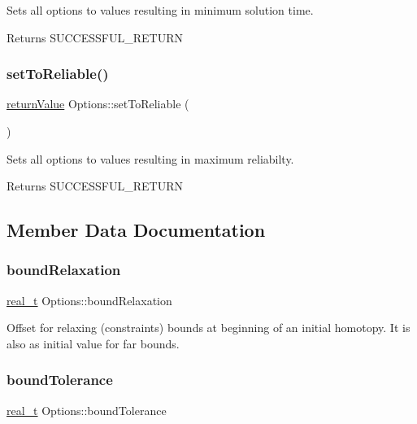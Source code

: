 Sets all options to values resulting in minimum solution time. \begin{DoxyReturn}{Returns}
S\+U\+C\+C\+E\+S\+S\+F\+U\+L\+\_\+\+R\+E\+T\+U\+RN 
\end{DoxyReturn}
\mbox{\label{class_options_a9febf0968f9e848e701b996b6694db73}} 
\subsubsection{\texorpdfstring{set\+To\+Reliable()}{setToReliable()}}
{\footnotesize\ttfamily \hyperlink{_message_handling_8hpp_a81d556f613bfbabd0b1f9488c0fa865e}{return\+Value} Options\+::set\+To\+Reliable (\begin{DoxyParamCaption}{ }\end{DoxyParamCaption})}

Sets all options to values resulting in maximum reliabilty. \begin{DoxyReturn}{Returns}
S\+U\+C\+C\+E\+S\+S\+F\+U\+L\+\_\+\+R\+E\+T\+U\+RN 
\end{DoxyReturn}


\subsection{Member Data Documentation}
\mbox{\label{class_options_aa23e1c8d7c64953adcc8cc2c3f03d25e}} 
\subsubsection{\texorpdfstring{bound\+Relaxation}{boundRelaxation}}
{\footnotesize\ttfamily \hyperlink{qp_o_a_s_e_s__wrapper_8h_a0d00e2b3dfadee81331bbb39068570c4}{real\+\_\+t} Options\+::bound\+Relaxation}

Offset for relaxing (constraints\textquotesingle{}) bounds at beginning of an initial homotopy. It is also as initial value for far bounds. \mbox{\label{class_options_a9cc43ec93c854bd0302de1a940fda5dd}} 
\subsubsection{\texorpdfstring{bound\+Tolerance}{boundTolerance}}
{\footnotesize\ttfamily \hyperlink{qp_o_a_s_e_s__wrapper_8h_a0d00e2b3dfadee81331bbb39068570c4}{real\+\_\+t} Options\+::bound\+Tolerance}

